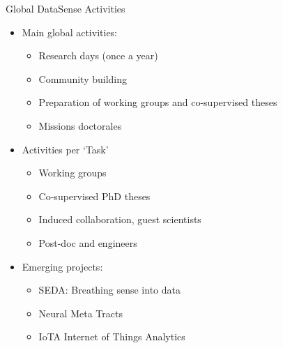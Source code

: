 \begin{frame}{Global DataSense Activities}

  \begin{itemize}
  \item Main global activities:
    \begin{itemize}
    \item Research days (once a year)
    \item Community building
    \item Preparation of working groups and co-supervised theses
    \item Missions doctorales
    \end{itemize}

  \item Activities per `Task'
    \begin{itemize}
    \item Working groups
    \item Co-supervised PhD theses
    \item Induced collaboration, guest scientists
    \item Post-doc and engineers
    \end{itemize}

  \item Emerging projects: 
    \begin{itemize}
    \item SEDA: Breathing sense into data
    \item Neural Meta Tracts
    \item IoTA Internet of Things Analytics
    \end{itemize}
  \end{itemize}

\end{frame}

